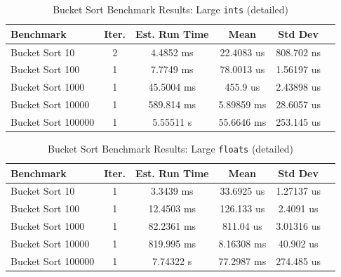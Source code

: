\documentclass{article}
\begin{document}
\begin{table}[H]
  \caption{Bucket Sort Benchmark Results: Large \texttt{ints} (detailed)\label{tab:ints-detailed}}
  \begin{tabular*}{\columnwidth}{@{\extracolsep\fill}lccccc}
    \hline
    Benchmark  & Iter. & Est. Run Time & Mean          & Std Dev       \\
    \hline
    Bucket Sort 10     & 2 & 4.4852 ms  & 22.4083 us  & 808.702 ns  \\
    Bucket Sort 100    & 1 & 7.7749 ms  & 78.0013 us  & 1.56197 us  \\
    Bucket Sort 1000   & 1 & 45.5004 ms & 455.9 us    & 2.43898 us  \\
    Bucket Sort 10000  & 1 & 589.814 ms & 5.89859 ms  & 28.6057 us  \\
    Bucket Sort 100000 & 1 & 5.55511 s  & 55.6646 ms  & 253.145 us  \\
    \hline
  \end{tabular*}
\end{table}

\begin{table}[H]
  \caption{Bucket Sort Benchmark Results: Large \texttt{floats} (detailed)\label{tab:floats-detailed}}
  \begin{tabular*}{\columnwidth}{@{\extracolsep\fill}lccccc}
    \hline
    Benchmark  & Iter. & Est. Run Time & Mean          & Std Dev       \\
    \hline
    Bucket Sort 10     & 1 & 3.3439  ms  & 33.6925 us  & 1.27137  us  \\
    Bucket Sort 100    & 1 & 12.4503 ms & 126.133  us  & 2.4091  us   \\
    Bucket Sort 1000   & 1 & 82.2361 ms & 811.04   us  & 3.01316 us  \\
    Bucket Sort 10000  & 1 & 819.995 ms & 8.16308  ms  & 40.902  us   \\
    Bucket Sort 100000 & 1 & 7.74322 s  & 77.2987  ms  & 274.485 us  \\
    \hline
  \end{tabular*}
\end{table}

\vspace{1em}
\end{document}
